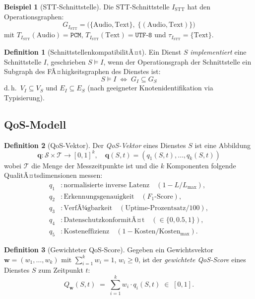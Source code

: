 ﻿\documentclass[a4paper,12pt]{article}
\theoremstyle{definition}
\newtheorem{definition}{Definition}
\newtheorem{beispiel}{Beispiel}
\begin{document}
\begin{beispiel}[STT-Schnittstelle]
Die STT-Schnittstelle $I_{\mathrm{STT}}$ hat den Operationsgraphen:
\[
G_{I_{\mathrm{STT}}} = \bigl(\{\text{Audio}, \text{Text}\},\; \{(\text{Audio}, \text{Text})\}\bigr)
\]
mit $T_{I_{\mathrm{STT}}}(\text{Audio}) = \texttt{PCM}$, $T_{I_{\mathrm{STT}}}(\text{Text}) = \texttt{UTF-8}$ und $\tau_{I_{\mathrm{STT}}} = \{\text{Text}\}$.
\end{beispiel}

\begin{definition}[SchnittstellenkompatibilitÃ¤t]
\label{def:kompatibilitaet}
Ein Dienst $S$ \emph{implementiert} eine Schnittstelle $I$, geschrieben $S \models I$, wenn der Operationsgraph der Schnittstelle ein Subgraph des FÃ¤higkeitsgraphen des Dienstes ist:
\[
    S \models I \;\iff\; G_I \subseteq G_S
\]
d.\,h.\ $V_I \subseteq V_S$ und $E_I \subseteq E_S$ (nach geeigneter Knotenidentifikation via Typisierung).
\end{definition}

\subsection{QoS-Modell}

\begin{definition}[QoS-Vektor]
\label{def:qos}
Der \emph{QoS-Vektor} eines Dienstes $S$ ist eine Abbildung
\[
    \mathbf{q}: \mathcal{S} \times \mathcal{T} \to [0,1]^k, \quad \mathbf{q}(S, t) = (q_1(S,t), \ldots, q_k(S,t))
\]
wobei $\mathcal{T}$ die Menge der Messzeitpunkte ist und die $k$ Komponenten folgende QualitÃ¤tsdimensionen messen:
\begin{align*}
q_1 &: \text{normalisierte inverse Latenz} \quad (1 - L/L_{\max}), \\
q_2 &: \text{Erkennungsgenauigkeit} \quad (F_1\text{-Score}), \\
q_3 &: \text{VerfÃ¼gbarkeit} \quad (\text{Uptime-Prozentsatz} / 100), \\
q_4 &: \text{DatenschutzkonformitÃ¤t} \quad (\in \{0, 0.5, 1\}), \\
q_5 &: \text{Kosteneffizienz} \quad (1 - \mathrm{Kosten}/\mathrm{Kosten}_{\max}).
\end{align*}
\end{definition}

\begin{definition}[Gewichteter QoS-Score]
\label{def:score}
Gegeben ein Gewichtsvektor $\mathbf{w} = (w_1, \ldots, w_k)$ mit $\sum_{i=1}^k w_i = 1$, $w_i \geq 0$, ist der \emph{gewichtete QoS-Score} eines Dienstes $S$ zum Zeitpunkt $t$:
\[
    Q_{\mathbf{w}}(S, t) \;=\; \sum_{i=1}^{k} w_i \cdot q_i(S, t) \;\in\; [0, 1].
\]
\end{definition}
\end{document}
